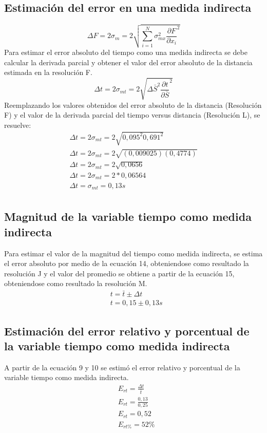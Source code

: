 \documentclass[runningheads]{llncs}
\begin{document}
    \subsection*{Estimación del error en una medida indirecta}
    \begin{equation}
        \Delta F=2\sigma_{m}=2{\sqrt{{\displaystyle\sum_{i=1}^{N}\sigma_{mx}^{2} \frac{\partial F}{\partial x_{i}}^{2}}}}
    \end{equation}
    Para estimar el error absoluto del tiempo como una medida indirecta se debe calcular la derivada parcial y obtener el valor del error absoluto de la distancia estimada en la resolución F.
    \begin{equation}
        \Delta t=2\sigma_{mt}=2{\sqrt{\Delta \bar{S}^{2} \frac{\partial t}{\partial \bar{S}}^{2}}}
    \end{equation}
    Reemplazando los valores obtenidos del error absoluto de la distancia (Resolución F) y el valor de la derivada parcial del tiempo versus distancia (Resolución L), se resuelve:
    \begin{align*}
        \Delta t=2\sigma_{mt}=2{\sqrt{0,095^{2} 0,691^{2}}}\\
        \Delta t=2\sigma_{mt}=2{\sqrt{(0,009025) (0,4774)}}\\
        \Delta t=2\sigma_{mt}=2{\sqrt{0,0656}}\\
        \Delta t=2\sigma_{mt}=2*0,06564\\
        \Delta t=\sigma_{mt}=0,13s\tag{J}\\
    \end{align*}
    \subsection*{Magnitud de la variable tiempo como medida indirecta}
    Para estimar el valor de la magnitud del tiempo como medida indirecta, se estima el error absoluto por medio de la ecuación 14, obteniendose como resultado la resolución J y el valor del promedio se obtiene a partir de la
    ecuación 15, obteniendose como resultado la resolución M.
    \begin{align*}
        &t=\bar{t}\pm \Delta t\\
        &t=0,15 \pm0,13 s
    \end{align*} 
    \subsection{Estimación del error relativo y porcentual de la variable tiempo como medida indirecta}
    A partir de la ecuación 9 y 10 se estimó el error relativo y porcentual de la variable tiempo como medida indirecta. 
    \begin{align*}
        &E_{rt}=\frac{\Delta t}{\bar{t}}\\
        &E_{rt}=\frac{0,13}{0,25}\\
        &E_{rt}=0,52 \tag{K}\\
        &E_{rt\%}=52\% \tag{L}
    \end{align*}
\end{document}
